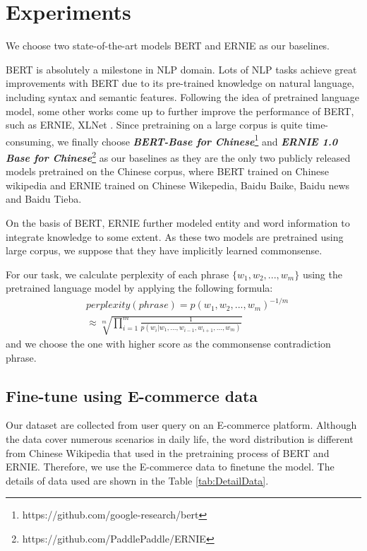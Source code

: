 \section{Experiments}
We choose two state-of-the-art models BERT \cite{devlin2018bert} and ERNIE \cite{sun2019ernie} as our baselines. 

BERT is absolutely a milestone in NLP domain. Lots of NLP tasks achieve great improvements with BERT due to its pre-trained knowledge on natural language, including syntax and semantic features. 
Following the idea of pretrained language model, some other works come up to further improve the performance of BERT, such as ERNIE, XLNet \cite{yang2019xlnet}. 
Since pretraining on a large corpus is quite time-consuming, we finally choose \textbf{\textit{BERT-Base for Chinese}}\footnote{https://github.com/google-research/bert}  and \textbf{\textit{ERNIE 1.0 Base for Chinese}}\footnote{https://github.com/PaddlePaddle/ERNIE} as our baselines as they are the only two publicly released models pretrained on the Chinese corpus, where BERT trained on Chinese wikipedia and ERNIE trained on Chinese Wikepedia, Baidu Baike, Baidu news and Baidu Tieba. 

On the basis of BERT, ERNIE further modeled entity and word information to integrate knowledge to some extent.
As these two models are pretrained using large corpus, we %
suppose that they have implicitly learned commonsense.

For our task, we calculate perplexity of each phrase $\{w_1, w_2, ..., w_m\}$ using the pretrained language model by applying the following formula:
\begin{equation}
\begin{split}
&perplexity(phrase) = p(w_1, w_2, ..., w_m)^{-1/m} \\
&\approx \sqrt[m]{\prod_{i=1}^{m}\frac{1}{p(w_i|w_1,...,w_{i-1},w_{i+1},..., w_m)}}
\end{split}
\end{equation}
and we choose the one with higher score as the commonsense contradiction phrase.



\subsection{Fine-tune using E-commerce data}
Our dataset are collected from user query on an E-commerce platform. Although the data cover numerous scenarios in daily life, the word distribution is different from Chinese Wikipedia that used in the pretraining process of BERT and ERNIE. Therefore, we use the E-commerce data to finetune the model. The details of data used are shown in the Table \ref{tab:DetailData}.

